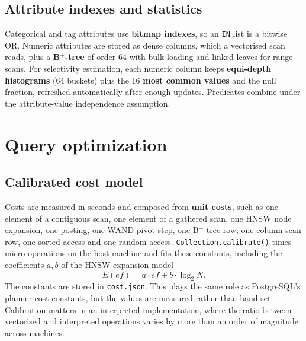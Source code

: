 \documentclass[11pt,a4paper]{article}
\newcommand{\code}[1]{\texttt{\small #1}}
\begin{document}
\subsection{Attribute indexes and statistics}
Categorical and tag attributes use \textbf{bitmap indexes}, so an \code{IN} list is a bitwise OR.
Numeric attributes are stored as dense columns, which a vectorised scan reads, plus a
\textbf{B$^+$-tree} of order 64 with bulk loading and linked leaves for range scans. For selectivity
estimation, each numeric column keeps \textbf{equi-depth histograms} (64 buckets) plus the 16
\textbf{most common values} and the null fraction, refreshed automatically after enough updates.
Predicates combine under the attribute-value independence assumption.

\section{Query optimization}
\label{sec:optimizer}

\subsection{Calibrated cost model}
Costs are measured in seconds and composed from \textbf{unit costs}, such as one element of a contiguous
scan, one element of a gathered scan, one HNSW node expansion, one posting, one WAND pivot step, one
B$^+$-tree row, one column-scan row, one sorted access and one random access.
\code{Collection.calibrate()} times micro-operations on the host machine and fits these constants,
including the coefficients $a, b$ of the HNSW expansion model
\begin{equation}
  E(ef) = a\cdot ef + b\cdot\log_2 N .
\end{equation}
The constants are stored in \code{cost.json}. This plays the same role as PostgreSQL's planner cost
constants, but the values are measured rather than hand-set. Calibration matters in an interpreted
implementation, where the ratio between vectorised and interpreted operations varies by more than an
order of magnitude across machines.
\end{document}
